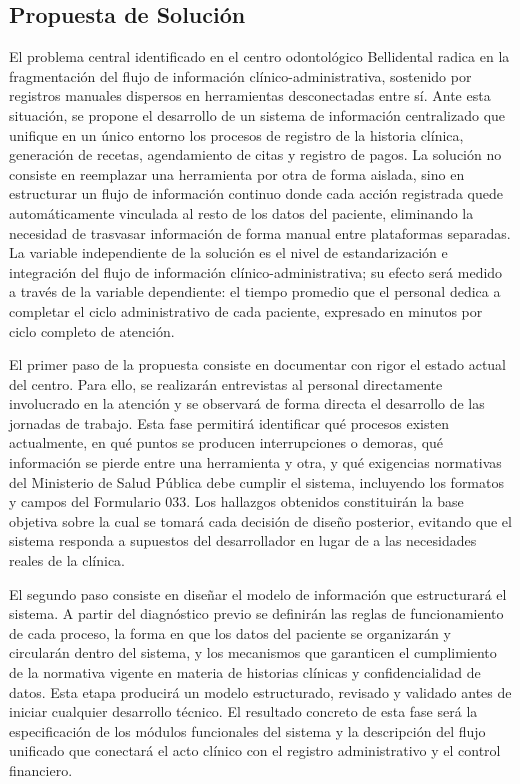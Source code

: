 \subsection{Propuesta de Solución}

El problema central identificado en el centro odontológico
Bellidental radica en la fragmentación del flujo de información
clínico-administrativa, sostenido por registros manuales dispersos
en herramientas desconectadas entre sí. Ante esta situación, se
propone el desarrollo de un sistema de información centralizado
que unifique en un único entorno los procesos de registro de la
historia clínica, generación de recetas, agendamiento de citas y
registro de pagos. La solución no consiste en reemplazar una
herramienta por otra de forma aislada, sino en estructurar un
flujo de información continuo donde cada acción registrada quede
automáticamente vinculada al resto de los datos del paciente,
eliminando la necesidad de trasvasar información de forma manual
entre plataformas separadas. La variable independiente de la
solución es el nivel de estandarización e integración del flujo de
información clínico-administrativa; su efecto será medido a través
de la variable dependiente: el tiempo promedio que el personal
dedica a completar el ciclo administrativo de cada paciente,
expresado en minutos por ciclo completo de atención.

El primer paso de la propuesta consiste en documentar con rigor el
estado actual del centro. Para ello, se realizarán entrevistas al
personal directamente involucrado en la atención y se observará de
forma directa el desarrollo de las jornadas de trabajo. Esta fase
permitirá identificar qué procesos existen actualmente, en qué
puntos se producen interrupciones o demoras, qué información se
pierde entre una herramienta y otra, y qué exigencias normativas
del Ministerio de Salud Pública debe cumplir el sistema, incluyendo
los formatos y campos del Formulario 033. Los hallazgos obtenidos
constituirán la base objetiva sobre la cual se tomará cada
decisión de diseño posterior, evitando que el sistema responda a
supuestos del desarrollador en lugar de a las necesidades reales
de la clínica.

El segundo paso consiste en diseñar el modelo de información que
estructurará el sistema. A partir del diagnóstico previo se
definirán las reglas de funcionamiento de cada proceso, la forma
en que los datos del paciente se organizarán y circularán dentro
del sistema, y los mecanismos que garanticen el cumplimiento de la
normativa vigente en materia de historias clínicas y
confidencialidad de datos. Esta etapa producirá un modelo
estructurado, revisado y validado antes de iniciar cualquier
desarrollo técnico. El resultado concreto de esta fase será la
especificación de los módulos funcionales del sistema y la
descripción del flujo unificado que conectará el acto clínico con
el registro administrativo y el control financiero.

